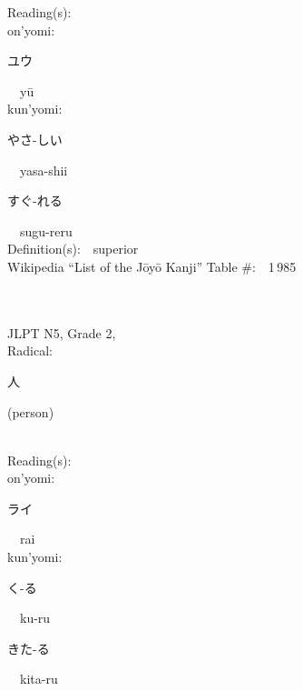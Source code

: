 \begin{multicols}{2}
Reading(s):\ \ \\
{\hspace*{1em}}on'yomi:\ \ \\
{\hspace*{2em}}{\begin{CJK}{UTF8}{min} ユウ \end{CJK}}\ \ y\=u\ \ \\
{\hspace*{1em}}kun'yomi:\ \ \\
{\hspace*{2em}}{\begin{CJK}{UTF8}{min} やさ-しい \end{CJK}}\ \ yasa-shii\ \ \\
{\hspace*{2em}}{\begin{CJK}{UTF8}{min} すぐ-れる \end{CJK}}\ \ sugu-reru\ \ \\
Definition(s):\ \ superior \\
Wikipedia ``List of the J\=oy\=o Kanji'' Table \#:\ \ 1\,985 \\
\ \ \\
{\fontsize{34pt}{40pt}  }\ \ \\  %
{JLPT N5, Grade 2, \\Radical:\ \ {\begin{CJK}{UTF8}{min} 人 \end{CJK}} (person) } \\
Reading(s):\ \ \\
{\hspace*{1em}}on'yomi:\ \ \\
{\hspace*{2em}}{\begin{CJK}{UTF8}{min} ライ \end{CJK}}\ \ rai\ \ \\
{\hspace*{1em}}kun'yomi:\ \ \\
{\hspace*{2em}}{\begin{CJK}{UTF8}{min} く-る \end{CJK}}\ \ ku-ru\ \ \\
{\hspace*{2em}}{\begin{CJK}{UTF8}{min} きた-る \end{CJK}}\ \ kita-ru\ \ \\

\end{multicols}
